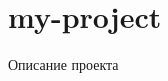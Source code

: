\chapter{my-\/project}
\hypertarget{md_README}{}\label{md_README}
\label{md_README_autotoc_md0}%
%
Описание проекта 